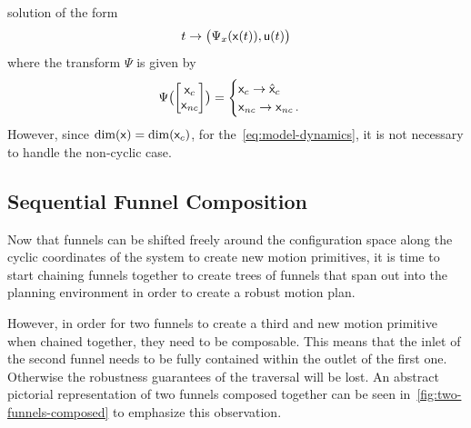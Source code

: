 solution of the form
\[
  t \rightarrow \bigl( \Psi_{x}({\mathbf{\mathsf{x}}}(t)), {\mathbf{\mathsf{u}}}(t) \bigr)
\]
where the transform \(\Psi\) is given by
\[
  \Psi \bigl( \begin{bmatrix}
    {\mathbf{\mathsf{x}}}_{c}  \\ {\mathbf{\mathsf{x}}}_{\mathit{nc}} 
  \end{bmatrix}
  \bigr) =
  \begin{cases}
    {\mathbf{\mathsf{x}}}_{c} \rightarrow \hat{{\mathbf{\mathsf{x}}}}_{c} \\
    {\mathbf{\mathsf{x}}}_{\mathit{nc}} \rightarrow {\mathbf{\mathsf{x}}}_{\mathit{nc}} \, .
  \end{cases}
\]
However, since \( \dim ({\mathbf{\mathsf{x}}}) = \dim({\mathbf{\mathsf{x}}}_{c}) \), for
the~\cref{eq:model-dynamics}, it is not necessary to handle the non-cyclic case.

\subsection{Sequential Funnel Composition}
\label{sec:composable-funnels}

Now that funnels can be shifted freely around the configuration space along the
cyclic coordinates of the system to create new motion primitives, it is time to
start chaining funnels together to create trees of funnels that span out into
the planning environment in order to create a robust motion plan.

However, in order for two funnels to create a third and new motion primitive
when chained together, they need to be composable. This means that the inlet of
the second funnel needs to be fully contained within the outlet of the first
one. Otherwise the robustness guarantees of the traversal will be lost. An
abstract pictorial representation of two funnels composed together can be seen
in~\cref{fig:two-funnels-composed} to emphasize this observation.

